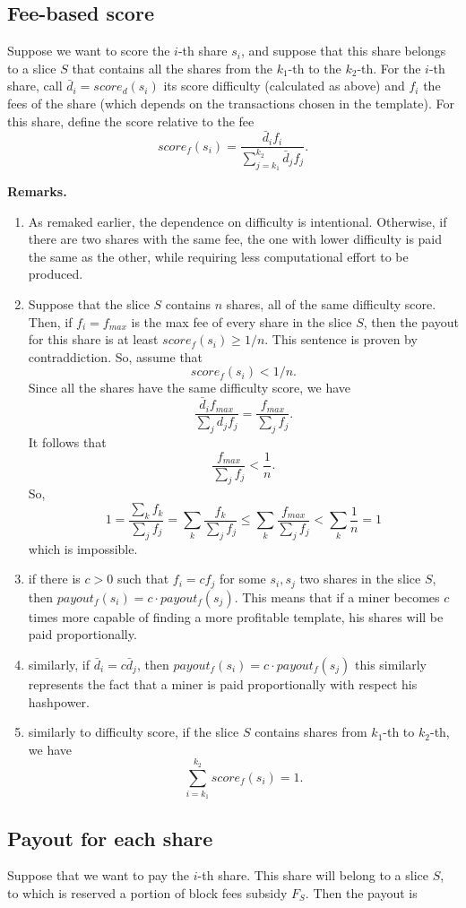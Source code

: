 \documentclass[11pt]{article}
\begin{document}
\subsection{Fee-based score}
Suppose we want to score the $i$-th share $s_i$, and suppose that this share belongs to a slice $S$ that contains all the shares from the $k_1$-th to the $k_2$-th.
For the $i$-th share, call $\bar d_i = score_d(s_i)$ its score difficulty (calculated as above) and $f_i$ the fees of the share (which depends on the transactions chosen in the template). For this share, define the score relative to the fee
\[
score_f(s_i) = \frac{\bar d_if_i}{\sum_{j=k_1}^{k_2}\bar d_j f_j}.
\]

\textbf{Remarks.} \begin{enumerate} 
\item As remaked earlier, the dependence on difficulty is intentional. Otherwise, if there are two shares with the same fee, the one with lower difficulty is paid the same as the other, while requiring less computational effort to be produced.
\item Suppose that the slice $S$ contains $n$ shares, all of the same difficulty score. Then, if $f_i = f_{max}$ is the max fee of every share in the slice $S$, then the payout for this share is at least $score_f(s_i) \ge 1/n$. This sentence is proven by contraddiction. So, assume that 
\[score_f(s_i) < 1/n.\]
Since all the shares have the same difficulty score, we have 
\[\frac{\bar d_if_{max}}{\sum_j d_j f_j} = \frac{f_{max}}{\sum_j f_j}.\]It follows that
\[ \frac{f_{max}}{\sum_j f_j} <\frac{1} {n}.\]
So,
\[ 1 = \frac{\sum_k f_k}{\sum_j f_j} = \sum_k \frac {f_k}{\sum_j f_j} \le \sum_k \frac{f_{max}}{\sum_j f_j}<\sum_k\frac{1}{n} = 1\]
which is impossible.
\item if there is $c>0$ such that $f_i = cf_j$ for some $s_i, s_j$ two shares in the slice $S$, then $payout_f(s_i) = c \cdot payout_f(s_j)$. This means that if a miner becomes $c$ times more capable of finding a more profitable template, his shares will be paid proportionally.
\item similarly, if $\bar d_i = c \bar d_j$, then $payout_f(s_i) = c \cdot payout_f(s_j)$ this similarly represents the fact that a miner is paid proportionally with respect his hashpower.
\item similarly to difficulty score, if the slice $S$ contains shares from $k_1$-th to $k_2$-th, we have \[\sum_{i=k_1}^{k_2} score_f(s_i) = 1. \]
\end{enumerate}
\subsection{Payout for each share}
Suppose that we want to pay the $i$-th share. This share will belong to a slice $S$, to which is reserved a portion of block fees subsidy $F_S$. Then the payout is
\end{document}
